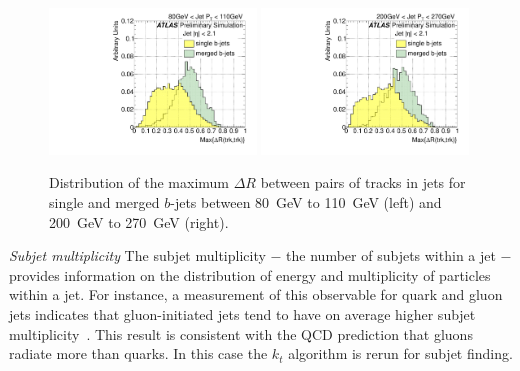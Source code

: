 \begin{figure}[tp]
\centering
\includegraphics[width=0.49\textwidth]{FIGS/VarsSingleMerged/drmax080.pdf}
\includegraphics[width=0.49\textwidth]{FIGS/VarsSingleMerged/drmax200.pdf}
\caption{Distribution of the maximum $\Delta R$ between pairs of tracks in jets for single and merged $b$-jets between 80~GeV to 110~GeV (left) and 200~GeV to 270~GeV (right).}
\label{fig:drmaxsinglemerged}
\end{figure}


{ \em Subjet multiplicity} The subjet multiplicity $-$ the number of subjets within a jet $-$ provides information on the distribution of energy and multiplicity of particles within a jet.  For instance, a measurement of this observable for quark and gluon jets indicates that gluon-initiated jets tend to have on average higher subjet multiplicity~\cite{Snihur1999494}. %
This result is consistent with the QCD prediction that gluons radiate more than quarks. In this case %
the $k_t$ algorithm is rerun for subjet finding.

